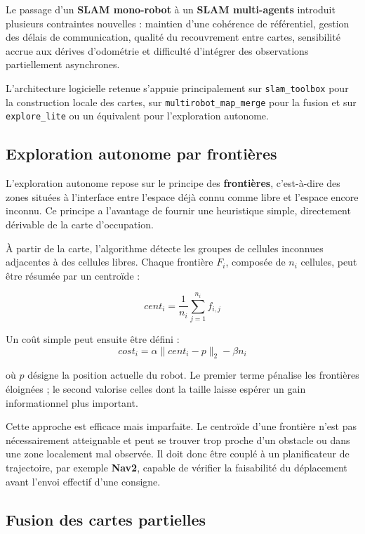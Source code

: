 \documentclass[11pt,a4paper]{report}
\newcommand{\kw}[1]{\textbf{#1}}
\begin{document}
Le passage d’un \kw{SLAM mono-robot} à un \kw{SLAM multi-agents} introduit plusieurs contraintes nouvelles : maintien d’une cohérence de référentiel, gestion des délais de communication, qualité du recouvrement entre cartes, sensibilité accrue aux dérives d’odométrie et difficulté d’intégrer des observations partiellement asynchrones.

L’architecture logicielle retenue s’appuie principalement sur \texttt{slam\_toolbox} pour la construction locale des cartes, sur \texttt{multirobot\_map\_merge} pour la fusion et sur \texttt{explore\_lite} ou un équivalent pour l’exploration autonome.

\subsection{Exploration autonome par frontières}

L’exploration autonome repose sur le principe des \kw{frontières}, c’est-à-dire des zones situées à l’interface entre l’espace déjà connu comme libre et l’espace encore inconnu. Ce principe a l’avantage de fournir une heuristique simple, directement dérivable de la carte d’occupation.

À partir de la carte, l’algorithme détecte les groupes de cellules inconnues adjacentes à des cellules libres. Chaque frontière \(F_i\), composée de \(n_i\) cellules, peut être résumée par un centroïde :

\[
cent_i = \frac{1}{n_i}\sum_{j=1}^{n_i} f_{i,j}
\]

Un coût simple peut ensuite être défini :
\[
cost_i = \alpha \|cent_i - p\|_2 - \beta n_i
\]

où \(p\) désigne la position actuelle du robot. Le premier terme pénalise les frontières éloignées ; le second valorise celles dont la taille laisse espérer un gain informationnel plus important.

Cette approche est efficace mais imparfaite. Le centroïde d’une frontière n’est pas nécessairement atteignable et peut se trouver trop proche d’un obstacle ou dans une zone localement mal observée. Il doit donc être couplé à un planificateur de trajectoire, par exemple \kw{Nav2}, capable de vérifier la faisabilité du déplacement avant l’envoi effectif d’une consigne.

\subsection{Fusion des cartes partielles}
\end{document}
